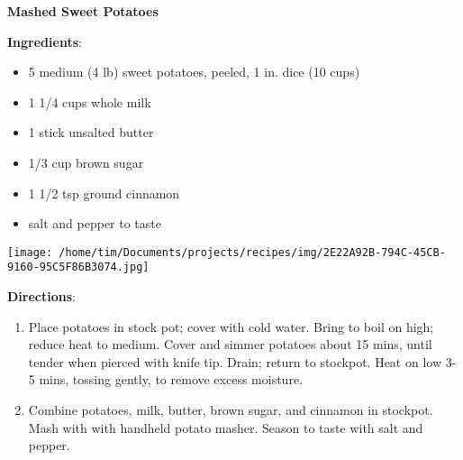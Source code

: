 \documentclass[11pt, twoside, openany]{book}
\begin{document}
\noindent\begin{minipage}[t]{\linewidth}%
{\Large\textbf{Mashed Sweet Potatoes}} \label{mashed-sweet-potatoes}\hfill\textit{}\\
\noindent\begin{minipage}[t]{0.78\linewidth}%
\textbf{Ingredients}:\vspace{-3mm}
\begin{multicols}{2}
\begin{itemize}\setlength\itemsep{-1mm}
\item 5 medium (4 lb) sweet potatoes, peeled, 1 in. dice (10 cups)
\item 1 1/4 cups whole milk
\item 1 stick unsalted butter
\item 1/3 cup brown sugar
\item 1 1/2 tsp ground cinnamon
\item salt and pepper to taste
\end{itemize}
\end{multicols}
\end{minipage}
\noindent\begin{minipage}[t]{0.18\linewidth}
\centering \strut\vspace*{-\baselineskip}\newline
\texttt{[image: /home/tim/Documents/projects/recipes/img/2E22A92B-794C-45CB-9160-95C5F86B3074.jpg]}\\
\end{minipage}\vspace{3mm}
\textbf{Directions}:
\vspace{-3mm}\begin{enumerate}\setlength\itemsep{-1mm}
\item Place potatoes in stock pot; cover with cold water. Bring to boil on high; reduce heat to medium. Cover and simmer potatoes about 15 mins, until tender when pierced with knife tip. Drain; return to stockpot. Heat on low 3-5 mins, tossing gently, to remove excess moisture.
\item Combine potatoes, milk, butter, brown sugar, and cinnamon in stockpot. Mash with with handheld potato masher. Season to taste with salt and pepper. 
\end{enumerate}
\end{minipage}\vspace{8mm}
\end{document}
